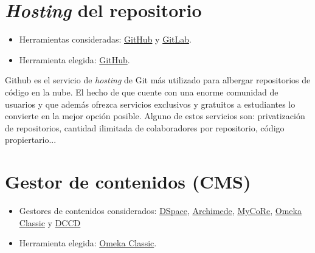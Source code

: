 \section{\emph{Hosting} del repositorio}\label{rep-host}
\begin{itemize}
\tightlist
	\item Herramientas consideradas: \href{https://github.com/}{GitHub} y
  		\href{https://gitlab.com/}{GitLab}.
	\item Herramienta elegida: \href{https://github.com/}{GitHub}.
\end{itemize}

Github es el servicio de \emph{hosting} de Git más utilizado para albergar repositorios de código en la nube. El hecho de que cuente con una enorme comunidad de usuarios y que además ofrezca servicios exclusivos y gratuitos a estudiantes lo convierte en la mejor opción posible. Alguno de estos servicios son: privatización de repositorios, cantidad ilimitada de colaboradores por repositorio, código propiertario... 

\section{Gestor de contenidos (CMS)}\label{cms}

\begin{itemize}
\tightlist
	\item Gestores de contenidos considerados:
  		\href{https://duraspace.org/dspace/}{DSpace},
  		\href{https://www.bibl.ulaval.ca/archimede/index.en.html}{Archimede},
  		\href{https://www.mycore.de/}{MyCoRe},
  		\href{https://omeka.org/classic/}{Omeka Classic} y
  		\href{https://github.com/DANS-KNAW/dccd-webui}{DCCD}
	\item Herramienta elegida: \href{https://omeka.org/classic/}{Omeka Classic}.
\end{itemize}

